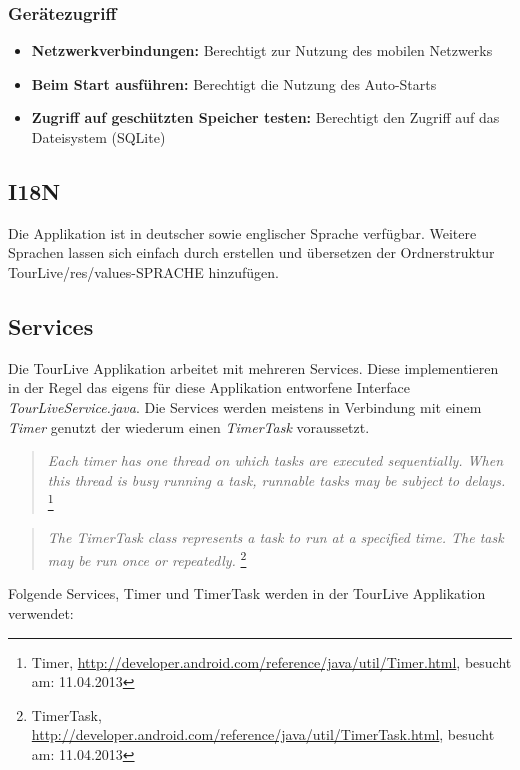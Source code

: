 \subsubsection{Gerätezugriff}
\begin{itemize} [noitemsep,topsep=0pt]
	\item \textbf{Netzwerkverbindungen:} Berechtigt zur Nutzung des mobilen Netzwerks
	\item \textbf{Beim Start ausführen:} Berechtigt die Nutzung des Auto-Starts
	\item \textbf{Zugriff auf geschützten Speicher testen:} Berechtigt den Zugriff auf das Dateisystem (SQLite)
\end{itemize}

\subsection{I18N}
Die Applikation ist in deutscher sowie englischer Sprache verfügbar. Weitere Sprachen lassen sich einfach durch erstellen  und übersetzen der Ordnerstruktur TourLive/res/values-SPRACHE hinzufügen.

\subsection{Services}
Die TourLive Applikation arbeitet mit mehreren Services. Diese implementieren in der Regel das eigens für diese Applikation entworfene Interface \textit{TourLiveService.java}. Die Services werden meistens in Verbindung mit einem \textit{Timer} genutzt der wiederum einen \textit{TimerTask} voraussetzt.

\begin{quotation}
\textit{Each timer has one thread on which tasks are executed sequentially. When this thread is busy running a task, runnable tasks may be subject to delays.} \footnote{Timer, \url{http://developer.android.com/reference/java/util/Timer.html}, besucht am: 11.04.2013}
\end{quotation}

\begin{quotation}
\textit{The TimerTask class represents a task to run at a specified time. The task may be run once or repeatedly.} \footnote{TimerTask, \url{http://developer.android.com/reference/java/util/TimerTask.html}, besucht am: 11.04.2013}
\end{quotation}

Folgende Services, Timer und TimerTask werden in der TourLive Applikation verwendet:


